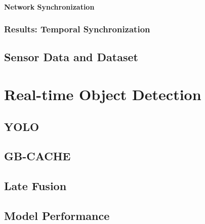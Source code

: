 \documentclass{erauthesis}
\begin{document}
\subsubsection{Network Synchronization} \label{time_sync_lan}


\subsection{Results: Temporal Synchronization} \label{results)time_sync_cam}


\section{Sensor Data and Dataset} \label{sec:sensor_data_dataset}


\chapter{Real-time Object Detection} \label{realtime_object_detection}


\section{YOLO} \label{yolo}


\section{GB-CACHE} \label{gbcache}



\section{Late Fusion} \label{late_fusion}


\section{Model Performance} \label{performance}
% 
\end{document}
